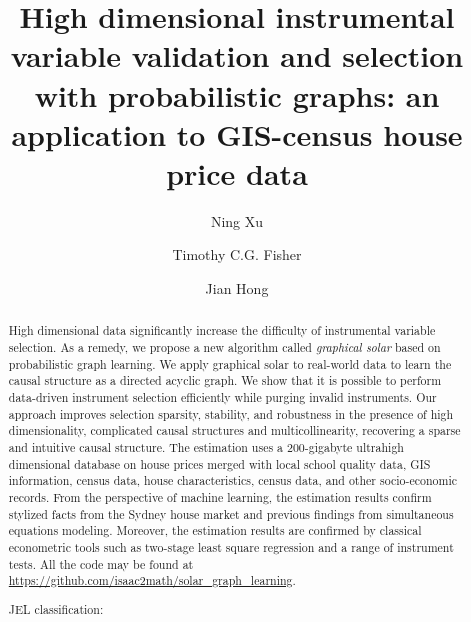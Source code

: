 \documentclass[11pt,review,authoryear]{elsarticle}
\begin{document}
\title{High dimensional instrumental variable validation and selection with probabilistic graphs: an application to GIS-census house price data}

\author{Ning Xu}
\address{School of Economics, University of Sydney, NSW 2006, Australia}

\author{Timothy C.G. Fisher}
\address{School of Economics, University of Sydney, NSW 2006, Australia}

\author{Jian Hong}
\address{School of Economics, University of Sydney, NSW 2006, Australia}


\begin{abstract}%
%
High dimensional data significantly increase the difficulty of instrumental variable selection. As a remedy, we propose a new algorithm called \emph{graphical solar} based on probabilistic graph learning. We apply graphical solar to real-world data to learn the causal structure as a directed acyclic graph. We show that it is possible to perform data-driven instrument selection efficiently while purging invalid instruments. Our approach improves selection sparsity, stability, and robustness in the presence of high dimensionality, complicated causal structures and multicollinearity, recovering a sparse and intuitive causal structure. The estimation uses a 200-gigabyte ultrahigh dimensional database on house prices merged with local school quality data, GIS information, census data, house characteristics, census data, and other socio-economic records. From the perspective of machine learning, the estimation results confirm stylized facts from the Sydney house market and previous findings from simultaneous equations modeling. Moreover, the estimation results are confirmed by classical econometric tools such as two-stage least square regression and a range of instrument tests. All the code may be found at \url{https://github.com/isaac2math/solar_graph_learning}.

\bigskip

\noindent
JEL classification:
\end{abstract}%
\end{document}

